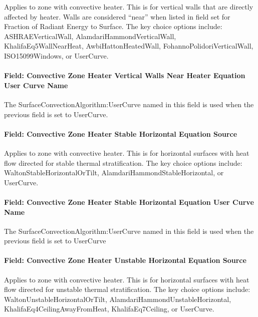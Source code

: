 Applies to zone with convective heater. This is for vertical walls that are directly affected by heater. Walls are considered ``near'' when listed in field set for Fraction of Radiant Energy to Surface. The key choice options include: ASHRAEVerticalWall, AlamdariHammondVerticalWall, KhalifaEq5WallNearHeat, AwbiHattonHeatedWall, FohannoPolidoriVerticalWall, ISO15099Windows, or UserCurve.

\paragraph{Field: Convective Zone Heater Vertical Walls Near Heater Equation User Curve Name}\label{field-convective-zone-heater-vertical-walls-near-heater-equation-user-curve-name}

The SurfaceConvectionAlgorithm:UserCurve named in this field is used when the previous field is set to UserCurve.

\paragraph{Field: Convective Zone Heater Stable Horizontal Equation Source}\label{field-convective-zone-heater-stable-horizontal-equation-source}

Applies to zone with convective heater. This is for horizontal surfaces with heat flow directed for stable thermal stratification. The key choice options include: WaltonStableHorizontalOrTilt, AlamdariHammondStableHorizontal, or UserCurve.

\paragraph{Field: Convective Zone Heater Stable Horizontal Equation User Curve Name}\label{field-convective-zone-heater-stable-horizontal-equation-user-curve-name}

The SurfaceConvectionAlgorithm:UserCurve named in this field is used when the previous field is set to UserCurve

\paragraph{Field: Convective Zone Heater Unstable Horizontal Equation Source}\label{field-convective-zone-heater-unstable-horizontal-equation-source}

Applies to zone with convective heater. This is for horizontal surfaces with heat flow directed for unstable thermal stratification. The key choice options include: WaltonUnstableHorizontalOrTilt, AlamdariHammondUnstableHorizontal, KhalifaEq4CeilingAwayFromHeat, KhalifaEq7Ceiling, or UserCurve.

